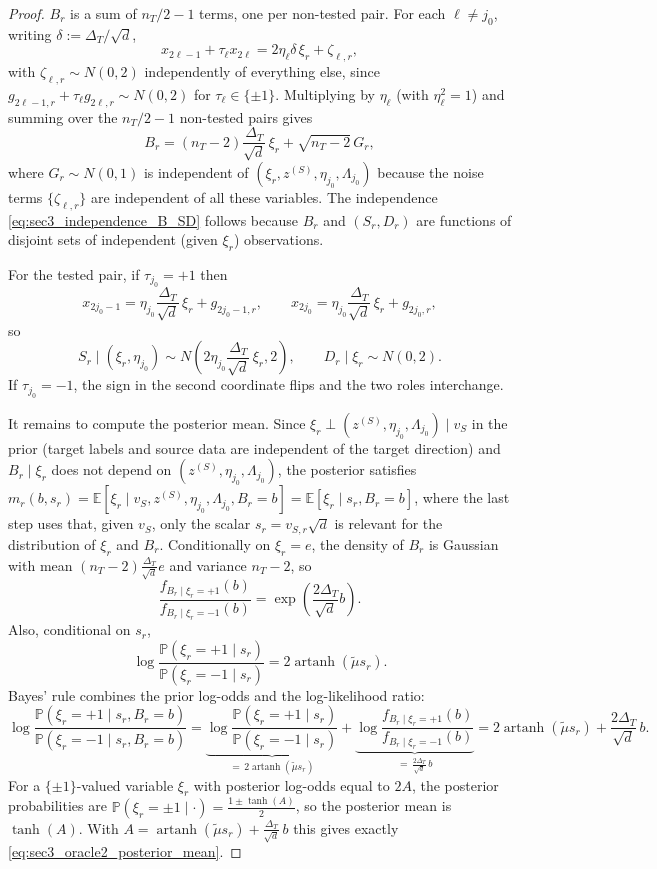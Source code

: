 \documentclass[10pt]{article}
\newcommand{\Pbb}{\mathbb P}
\newcommand{\Ebb}{\mathbb E}
\newcommand{\trg}{T}
\newcommand{\nT}{n_{\trg}}
\newcommand{\DeltaT}{\Delta_{\trg}}
\newcommand{\src}{S}
\newcommand{\zsrc}{z^{(\src)}}
\begin{document}
\begin{proof}
$B_r$ is a sum of $\nT/2-1$ terms, one per non-tested pair.
For each $\ell\neq j_0$, writing $\delta:=\DeltaT/\sqrt d$,
\[
    x_{2\ell-1}+\tau_\ell x_{2\ell}
    =
    2\eta_\ell\delta\,\xi_r+\zeta_{\ell,r},
\]
with $\zeta_{\ell,r}\sim N(0,2)$ independently of everything else, since
$g_{2\ell-1,r}+\tau_\ell g_{2\ell,r}\sim N(0,2)$ for $\tau_\ell\in\{\pm1\}$.
Multiplying by $\eta_\ell$ (with $\eta_\ell^2=1$) and summing over the
$\nT/2-1$ non-tested pairs gives
\[
    B_r
    =
    (\nT-2)\frac{\DeltaT}{\sqrt d}\,\xi_r+\sqrt{\nT-2}\,G_r,
\]
where $G_r\sim N(0,1)$ is independent of $(\xi_r,\zsrc,\eta_{j_0},\Lambda_{j_0})$
because the noise terms $\{\zeta_{\ell,r}\}$ are independent of all these
variables. The independence \eqref{eq:sec3_independence_B_SD} follows because
$B_r$ and $(S_r,D_r)$ are functions of disjoint sets of independent
(given $\xi_r$) observations.

For the tested pair, if $\tau_{j_0}=+1$ then
\[
    x_{2j_0-1}=\eta_{j_0}\frac{\DeltaT}{\sqrt d}\,\xi_r+g_{2j_0-1,r},
    \qquad
    x_{2j_0}=\eta_{j_0}\frac{\DeltaT}{\sqrt d}\,\xi_r+g_{2j_0,r},
\]
so
\[
    S_r\mid (\xi_r,\eta_{j_0}) \sim N\!\left(2\eta_{j_0}\frac{\DeltaT}{\sqrt d}\,\xi_r,2\right),
    \qquad
    D_r\mid \xi_r \sim N(0,2).
\]
If $\tau_{j_0}=-1$, the sign in the second coordinate flips and the two roles
interchange.

It remains to compute the posterior mean. Since $\xi_r\perp(\zsrc,\eta_{j_0},\Lambda_{j_0})\mid v_{\src}$
in the prior (target labels and source data are independent of the target
direction) and $B_r\mid\xi_r$ does not depend on $(\zsrc,\eta_{j_0},\Lambda_{j_0})$,
the posterior satisfies
$m_r(b,s_r)=\Ebb[\xi_r\mid v_{\src},\zsrc,\eta_{j_0},\Lambda_{j_0},B_r=b]
=\Ebb[\xi_r\mid s_r,B_r=b]$,
where the last step uses that, given $v_{\src}$, only the scalar
$s_r=v_{\src,r}\sqrt d$ is relevant for the distribution of $\xi_r$ and $B_r$.
Conditionally on $\xi_r=e$,
the density of $B_r$ is Gaussian with mean $(\nT-2)\frac{\DeltaT}{\sqrt d} e$ and variance
$\nT-2$, so
\[
    \frac{f_{B_r\mid\xi_r=+1}(b)}
         {f_{B_r\mid\xi_r=-1}(b)}
    =
    \exp\!\left(\frac{2\DeltaT}{\sqrt d} b\right).
\]
Also, conditional on $s_r$,
\[
    \log
    \frac{\Pbb(\xi_r=+1\mid s_r)}
         {\Pbb(\xi_r=-1\mid s_r)}
    =
    2\operatorname{artanh}(\tilde\mu s_r).
\]
Bayes' rule combines the prior log-odds and the log-likelihood ratio:
\[
    \log\frac{\Pbb(\xi_r=+1\mid s_r,B_r=b)}{\Pbb(\xi_r=-1\mid s_r,B_r=b)}
    =
    \underbrace{\log\frac{\Pbb(\xi_r=+1\mid s_r)}{\Pbb(\xi_r=-1\mid s_r)}}_{=\,2\operatorname{artanh}(\tilde\mu s_r)}
    +
    \underbrace{\log\frac{f_{B_r\mid\xi_r=+1}(b)}{f_{B_r\mid\xi_r=-1}(b)}}_{=\,\frac{2\DeltaT}{\sqrt d}\,b}
    =
    2\operatorname{artanh}(\tilde\mu s_r)+\frac{2\DeltaT}{\sqrt d}\,b.
\]
For a $\{\pm1\}$-valued variable $\xi_r$ with posterior log-odds equal to $2A$,
the posterior probabilities are $\Pbb(\xi_r=\pm1\mid\cdot)=\tfrac{1\pm\tanh(A)}{2}$,
so the posterior mean is $\tanh(A)$. With $A=\operatorname{artanh}(\tilde\mu s_r)+\frac{\DeltaT}{\sqrt d}\,b$
this gives exactly \eqref{eq:sec3_oracle2_posterior_mean}.
\end{proof}
\end{document}
